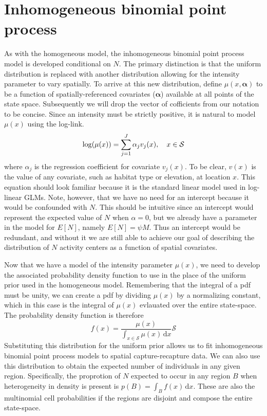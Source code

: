 \section{Inhomogeneous binomial point process}

As with the homogeneous model, the inhomogeneous binomial point process
model is developed conditional on $N$. The primary distinction is that
the uniform distribution is replaced with another distribution
allowing for the intensity parameter to vary spatially. To arrive at
this new distribution, define $\mu(x,\mathbf{\alpha})$ to be a function of
spatially-referenced covariates ($\mathbf{\alpha}$) available at all points of the state
space.  Subsequently we will drop the vector of cofficients from our
notation to be concise. Since an intensity must be strictly
positive, it is natural to model $\mu(x)$ using the log-link.
\[
\log(\mu(x)) = \sum_{j=1}^J \alpha_j v_j(x), \quad  x \in \cal{S}
\]
where $\alpha_j$ is the regression coefficient for covariate
$v_j(x)$. To be clear, $v(x)$ is the value of any covariate, such as
habitat type or elevation, at location $x$.  This equation should look
familiar because it is the standard linear model used in log-linear
GLMs. Note, however, that we have no need
for an intercept because it would be confounded with
$N$. This should be intuitive since an intercept would
represent the expected value of $N$ when $\alpha=0$, but we already
have a parameter in the model for $E[N]$, namely $E[N] =
\psi M$. Thus an intercept would be
redundant, and without it we are still able to achieve our goal of
describing the distribution of $N$ activity centers as a function of
spatial covariates.

Now that we have a model of the intensity parameter $\mu(x)$,
we need to develop the associated probability density function to use
in the place of the uniform prior used in the homogeneous
model. Remembering that
the integral of a pdf must be unity, we can create a pdf by dividing
$\mu(x)$ by a normalizing constant, which in this case is the integral
of $\mu(x)$ evlauated over the entire
state-space. The probability density function is therefore
\begin{equation}
f(x) = \frac{\mu(x)}{\int_{x \in \mathcal{S}} \mu(x)\, \mathrm{d}x}
\mathcal{S}
\label{eq:pdf-ipp}
\end{equation}
Substituting this distribution for the
uniform prior allows us to fit inhomogeneous binomial point process
models to spatial capture-recapture data. We can also use this
distribution to obtain the expected number of individuals in any given
region. Specifically, the proprotion of $N$ expected to occur in any
region $B$ when heterogeneity in density is present is $p(B) = \int_B
f(x)\, \mathrm{d}x$. These are
also the multinomial cell probabilities if the regions are
disjoint and compose the entire state-space.

